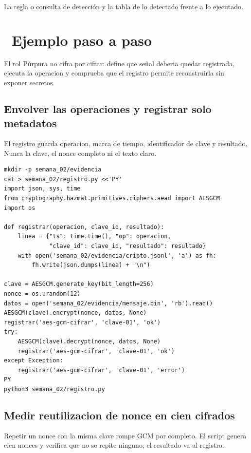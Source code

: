 \documentclass[11pt,a4paper]{article}
\newcommand{\iconotexto}[2]{\textcolor{cyanNeon}{\faIcon{#1}}~#2}
\begin{document}
La regla o consulta de detección y la tabla de lo detectado frente a lo ejecutado.

\section{\iconotexto{list-ol}{Ejemplo paso a paso}}

El rol Púrpura no cifra por cifrar: define que señal deberia quedar registrada, ejecuta la operacion y comprueba que el registro permite reconstruirla sin exponer secretos.

\subsection{Envolver las operaciones y registrar solo metadatos}

El registro guarda operacion, marca de tiempo, identificador de clave y resultado. Nunca la clave, el nonce completo ni el texto claro.

\begin{lstlisting}[style=estiloCodigo]
mkdir -p semana_02/evidencia
cat > semana_02/registro.py <<'PY'
import json, sys, time
from cryptography.hazmat.primitives.ciphers.aead import AESGCM
import os

def registrar(operacion, clave_id, resultado):
    linea = {"ts": time.time(), "op": operacion,
             "clave_id": clave_id, "resultado": resultado}
    with open('semana_02/evidencia/cripto.jsonl', 'a') as fh:
        fh.write(json.dumps(linea) + "\n")

clave = AESGCM.generate_key(bit_length=256)
nonce = os.urandom(12)
datos = open('semana_02/evidencia/mensaje.bin', 'rb').read()
AESGCM(clave).encrypt(nonce, datos, None)
registrar('aes-gcm-cifrar', 'clave-01', 'ok')
try:
    AESGCM(clave).decrypt(nonce, datos, None)
    registrar('aes-gcm-cifrar', 'clave-01', 'ok')
except Exception:
    registrar('aes-gcm-cifrar', 'clave-01', 'error')
PY
python3 semana_02/registro.py
\end{lstlisting}

\subsection{Medir reutilizacion de nonce en cien cifrados}

Repetir un nonce con la misma clave rompe GCM por completo. El script genera cien nonces y verifica que no se repite ninguno; el resultado va al registro.
\end{document}
